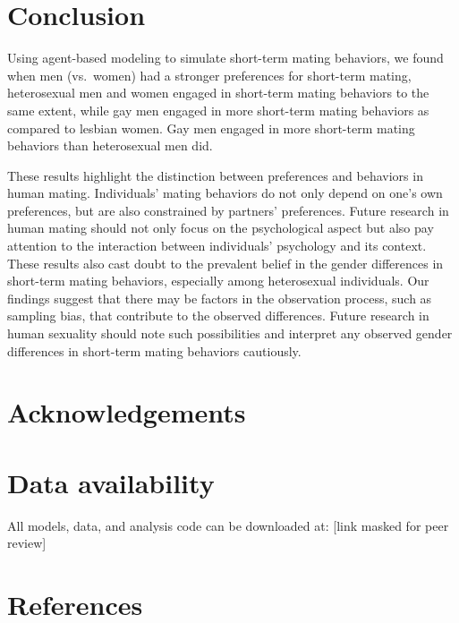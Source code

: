 \documentclass[
  11pt,
]{article}
\begin{document}
\hypertarget{conclusion}{%
\section{Conclusion}\label{conclusion}}

Using agent-based modeling to simulate short-term mating behaviors, we
found when men (vs.~women) had a stronger preferences for short-term
mating, heterosexual men and women engaged in short-term mating
behaviors to the same extent, while gay men engaged in more short-term
mating behaviors as compared to lesbian women. Gay men engaged in more
short-term mating behaviors than heterosexual men did.

These results highlight the distinction between preferences and
behaviors in human mating. Individuals' mating behaviors do not only
depend on one's own preferences, but are also constrained by partners'
preferences. Future research in human mating should not only focus on
the psychological aspect but also pay attention to the interaction
between individuals' psychology and its context. These results also cast
doubt to the prevalent belief in the gender differences in short-term
mating behaviors, especially among heterosexual individuals. Our
findings suggest that there may be factors in the observation process,
such as sampling bias, that contribute to the observed differences.
Future research in human sexuality should note such possibilities and
interpret any observed gender differences in short-term mating behaviors
cautiously.

\hypertarget{acknowledgements}{%
\section{Acknowledgements}\label{acknowledgements}}

\hypertarget{data-availability}{%
\section{Data availability}\label{data-availability}}

All models, data, and analysis code can be downloaded at: {[}link masked
for peer review{]}

\newpage

\hypertarget{references}{%
\section*{References}\label{references}}
\end{document}
